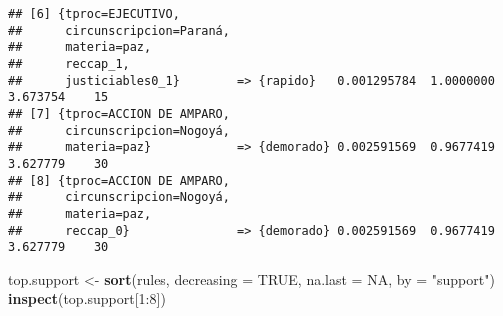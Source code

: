 \documentclass[runningheads,a4paper]{llncs}
\newenvironment{Shaded}{\footnotesize}{}
\newcommand{\KeywordTok}[1]{\textcolor[rgb]{0.00,0.44,0.13}{\textbf{{#1}}}}
\newcommand{\DataTypeTok}[1]{\textcolor[rgb]{0.56,0.13,0.00}{{#1}}}
\newcommand{\DecValTok}[1]{\textcolor[rgb]{0.25,0.63,0.44}{{#1}}}
\newcommand{\StringTok}[1]{\textcolor[rgb]{0.25,0.44,0.63}{{#1}}}
\newcommand{\OtherTok}[1]{\textcolor[rgb]{0.00,0.44,0.13}{{#1}}}
\newcommand{\NormalTok}[1]{{#1}}
\newcommand{\OperatorTok}[1]{\textcolor[rgb]{0.40,0.40,0.40}{{#1}}}
\begin{document}
\begin{verbatim}
## [6] {tproc=EJECUTIVO,                                                           
##      circunscripcion=Paraná,                                                    
##      materia=paz,                                                               
##      reccap_1,                                                                  
##      justiciables0_1}        => {rapido}   0.001295784  1.0000000 3.673754    15
## [7] {tproc=ACCION DE AMPARO,                                                    
##      circunscripcion=Nogoyá,                                                    
##      materia=paz}            => {demorado} 0.002591569  0.9677419 3.627779    30
## [8] {tproc=ACCION DE AMPARO,                                                    
##      circunscripcion=Nogoyá,                                                    
##      materia=paz,                                                               
##      reccap_0}               => {demorado} 0.002591569  0.9677419 3.627779    30
\end{verbatim}

\normalsize

\scriptsize

\begin{Shaded}
\begin{Highlighting}[]
\NormalTok{top.support <-}\StringTok{ }\KeywordTok{sort}\NormalTok{(rules, }\DataTypeTok{decreasing =} \OtherTok{TRUE}\NormalTok{, }
                    \DataTypeTok{na.last =} \OtherTok{NA}\NormalTok{, }\DataTypeTok{by =} \StringTok{"support"}\NormalTok{)}
\KeywordTok{inspect}\NormalTok{(top.support[}\DecValTok{1}\OperatorTok{:}\DecValTok{8}\NormalTok{])}
\end{Highlighting}
\end{Shaded}
\end{document}
